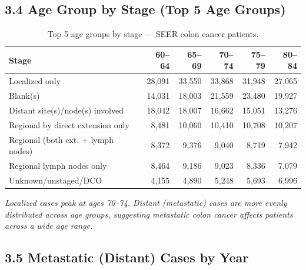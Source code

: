 \documentclass[11pt, a4paper]{article}
\begin{document}
\subsection*{3.4 Age Group by Stage (Top 5 Age Groups)}

\begin{table}[H]
\centering
\renewcommand{\arraystretch}{1.3}
\begin{tabular}{lrrrrr}
\toprule
\textbf{Stage} & \textbf{60--64} & \textbf{65--69} & \textbf{70--74} & \textbf{75--79} & \textbf{80--84} \\
\midrule
Localized only                                               & 28,091 & 33,550 & 33,868 & 31,948 & 27,065 \\
Blank(s)                                                     & 14,031 & 18,003 & 21,559 & 23,480 & 19,927 \\
Distant site(s)/node(s) involved                             & 18,042 & 18,007 & 16,662 & 15,051 & 13,276 \\
Regional by direct extension only                            &  8,481 & 10,060 & 10,410 & 10,708 & 10,207 \\
Regional (both ext. + lymph nodes)                           &  8,372 &  9,376 &  9,040 &  8,719 &  7,942 \\
Regional lymph nodes only                                    &  8,464 &  9,186 &  9,023 &  8,336 &  7,079 \\
Unknown/unstaged/DCO                                         &  4,155 &  4,890 &  5,248 &  5,693 &  6,996 \\
\bottomrule
\end{tabular}
\caption{Top 5 age groups by stage --- SEER colon cancer patients.}
\end{table}

\noindent\textit{Localized cases peak at ages 70--74. Distant (metastatic) cases are more evenly distributed across age groups, suggesting metastatic colon cancer affects patients across a wide age range.}

\vspace{6pt}

\subsection*{3.5 Metastatic (Distant) Cases by Year}
\end{document}

